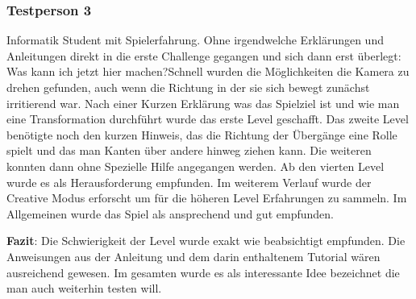 \subsubsection*{Testperson 3}

Informatik Student mit Spielerfahrung. Ohne irgendwelche Erklärungen und Anleitungen direkt in die erste Challenge gegangen und sich dann erst überlegt: \glqq Was kann ich jetzt hier machen?\grqq Schnell wurden die Möglichkeiten die Kamera zu drehen gefunden, auch wenn die Richtung in der sie sich bewegt zunächst irritierend war. Nach einer Kurzen Erklärung was das Spielziel ist und wie man eine Transformation durchführt wurde das erste Level geschafft. Das zweite Level benötigte noch den kurzen Hinweis, das die Richtung der Übergänge eine Rolle spielt und das man Kanten über andere hinweg ziehen kann. Die weiteren konnten dann ohne Spezielle Hilfe angegangen werden. Ab den vierten Level wurde es als Herausforderung empfunden. Im weiterem Verlauf wurde der Creative Modus erforscht um für die höheren Level Erfahrungen zu sammeln. Im Allgemeinen wurde das Spiel als ansprechend und gut empfunden.

{\bf Fazit}: Die Schwierigkeit der Level wurde exakt wie beabsichtigt empfunden. Die Anweisungen aus der Anleitung und dem darin enthaltenem Tutorial wären ausreichend gewesen.
Im gesamten wurde es als interessante Idee bezeichnet die man auch weiterhin testen will.




